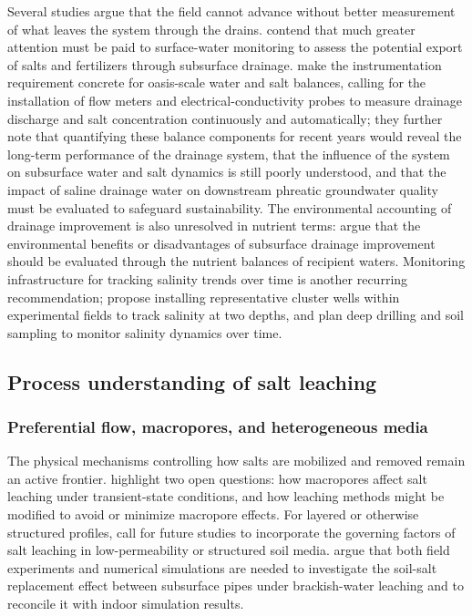 Several studies argue that the field cannot advance without better measurement of what leaves the system through the drains. \textcite{Mastrocicco2013} contend that much greater attention must be paid to surface-water monitoring to assess the potential export of salts and fertilizers through subsurface drainage. \textcite{Askri2022} make the instrumentation requirement concrete for oasis-scale water and salt balances, calling for the installation of flow meters and electrical-conductivity probes to measure drainage discharge and salt concentration continuously and automatically; they further note that quantifying these balance components for recent years would reveal the long-term performance of the drainage system, that the influence of the system on subsurface water and salt dynamics is still poorly understood, and that the impact of saline drainage water on downstream phreatic groundwater quality must be evaluated to safeguard sustainability. The environmental accounting of drainage improvement is also unresolved in nutrient terms: \textcite{Turtola1995} argue that the environmental benefits or disadvantages of subsurface drainage improvement should be evaluated through the nutrient balances of recipient waters. Monitoring infrastructure for tracking salinity trends over time is another recurring recommendation; \textcite{Singh2020d} propose installing representative cluster wells within experimental fields to track salinity at two depths, and \textcite{Gafni2001} plan deep drilling and soil sampling to monitor salinity dynamics over time.

\subsection{Process understanding of salt leaching}

\subsubsection{Preferential flow, macropores, and heterogeneous media}

The physical mechanisms controlling how salts are mobilized and removed remain an active frontier. \textcite{Xin2016} highlight two open questions: how macropores affect salt leaching under transient-state conditions, and how leaching methods might be modified to avoid or minimize macropore effects. For layered or otherwise structured profiles, \textcite{Zhang2022} call for future studies to incorporate the governing factors of salt leaching in low-permeability or structured soil media. \textcite{Li2023} argue that both field experiments and numerical simulations are needed to investigate the soil-salt replacement effect between subsurface pipes under brackish-water leaching and to reconcile it with indoor simulation results.

